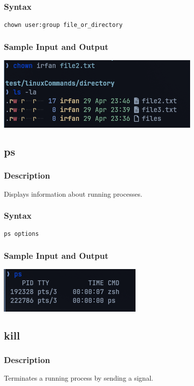 \subsubsection{Syntax}
\begin{verbatim}
chown user:group file_or_directory
\end{verbatim}

\subsubsection{Sample Input and Output}
\includegraphics[]{Cycle_1//Outputs/chown.png}


\subsection{ps}
\subsubsection{Description}
Displays information about running processes.

\subsubsection{Syntax}
\begin{verbatim}
ps options
\end{verbatim}

\subsubsection{Sample Input and Output}
\includegraphics[]{Cycle_1//Outputs/ps.png}

\subsection{kill}
\subsubsection{Description}
Terminates a running process by sending a signal.

